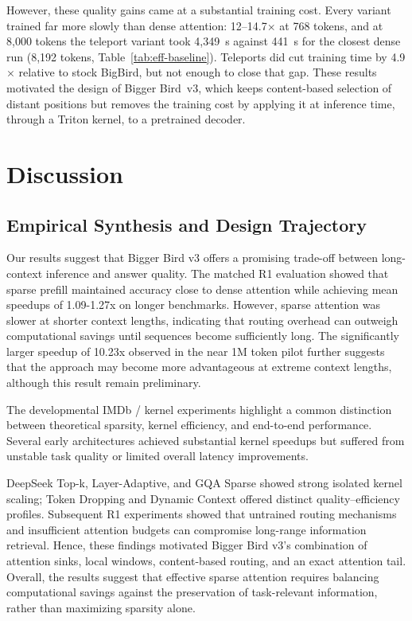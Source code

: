 \documentclass[11pt]{article}
\begin{document}
However, these quality gains came at a substantial training cost. Every
variant trained far more slowly than dense attention: 12--14.7$\times$ at 768
tokens, and at 8{,}000 tokens the teleport variant took 4{,}349~s against
441~s for the closest dense run (8{,}192 tokens,
Table~\ref{tab:eff-baseline}). Teleports did cut training time by 4.9$\times$ relative to stock BigBird,
but not enough to close that gap. These results motivated the design of
Bigger Bird~v3, which keeps content-based selection of distant positions but
removes the training cost by applying it at inference time, through a Triton
kernel, to a pretrained decoder.

\FloatBarrier
\section{Discussion}

\subsection{Empirical Synthesis and Design Trajectory}

Our results suggest that Bigger Bird v3 offers a promising trade-off between long-context inference and answer quality. The matched R1 evaluation showed that sparse prefill maintained accuracy close to dense attention while achieving mean speedups of 1.09-1.27x on longer benchmarks. However, sparse attention was slower at shorter context lengths, indicating that routing overhead can outweigh computational savings until sequences become sufficiently long. The significantly larger speedup of 10.23x observed in the near 1M token pilot further suggests that the approach may become more advantageous at extreme context lengths, although this result remain preliminary. 

The developmental IMDb / kernel experiments highlight a common distinction between theoretical sparsity, kernel efficiency, and end-to-end performance. Several early architectures achieved substantial kernel speedups but suffered from unstable task quality or limited overall latency improvements. 

DeepSeek Top-k, Layer-Adaptive, and GQA Sparse showed strong
isolated kernel scaling; Token Dropping and Dynamic Context offered distinct quality--efficiency profiles. Subsequent R1 experiments showed that untrained routing mechanisms and insufficient attention budgets can compromise long-range information retrieval. Hence, these findings motivated Bigger Bird v3's combination of attention sinks, local windows, content-based routing, and an exact attention tail. Overall, the results suggest that effective sparse attention requires balancing computational savings against the preservation of task-relevant information, rather than maximizing sparsity alone. 
\end{document}
